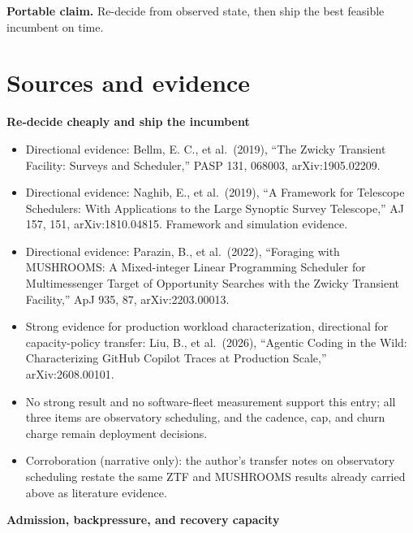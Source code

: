 \textbf{Portable claim.} Re-decide from observed state, then ship the best feasible incumbent on time.

\section*{Sources and evidence}

\textbf{Re-decide cheaply and ship the incumbent}

\begin{itemize}
\tightlist
\item
  Directional evidence: Bellm, E. C., et al.~(2019), ``The Zwicky Transient Facility: Surveys and Scheduler,'' PASP 131, 068003, arXiv:1905.02209.
\item
  Directional evidence: Naghib, E., et al.~(2019), ``A Framework for Telescope Schedulers: With Applications to the Large Synoptic Survey Telescope,'' AJ 157, 151, arXiv:1810.04815. Framework and simulation evidence.
\item
  Directional evidence: Parazin, B., et al.~(2022), ``Foraging with MUSHROOMS: A Mixed-integer Linear Programming Scheduler for Multimessenger Target of Opportunity Searches with the Zwicky Transient Facility,'' ApJ 935, 87, arXiv:2203.00013.
\item
  Strong evidence for production workload characterization, directional for capacity-policy transfer: Liu, B., et al.~(2026), ``Agentic Coding in the Wild: Characterizing GitHub Copilot Traces at Production Scale,'' arXiv:2608.00101.
\item
  No strong result and no software-fleet measurement support this entry; all three items are observatory scheduling, and the cadence, cap, and churn charge remain deployment decisions.
\item
  Corroboration (narrative only): the author's transfer notes on observatory scheduling restate the same ZTF and MUSHROOMS results already carried above as literature evidence.
\end{itemize}

\textbf{Admission, backpressure, and recovery capacity}

